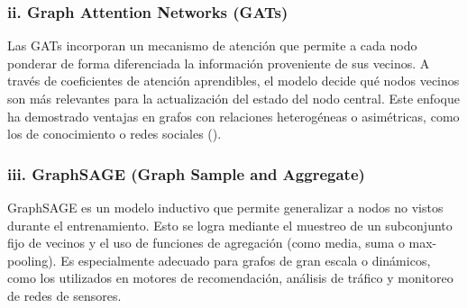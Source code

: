 \documentclass[11pt]{article} %
\begin{document}
\subsubsection{ii. Graph Attention Networks (GATs)}
Las GATs incorporan un mecanismo de atención que permite a cada nodo ponderar de forma diferenciada la información proveniente de sus vecinos. A través de coeficientes de atención aprendibles, el modelo decide qué nodos vecinos son más relevantes para la actualización del estado del nodo central. Este enfoque ha demostrado ventajas en grafos con relaciones heterogéneas o asimétricas, como los de conocimiento o redes sociales (\cite{dgl2024gat}).

\subsubsection{iii. GraphSAGE (Graph Sample and Aggregate)}
GraphSAGE es un modelo inductivo que permite generalizar a nodos no vistos durante el entrenamiento. Esto se logra mediante el muestreo de un subconjunto fijo de vecinos y el uso de funciones de agregación (como media, suma o max-pooling). Es especialmente adecuado para grafos de gran escala o dinámicos, como los utilizados en motores de recomendación, análisis de tráfico y monitoreo de redes de sensores.
\end{document}
